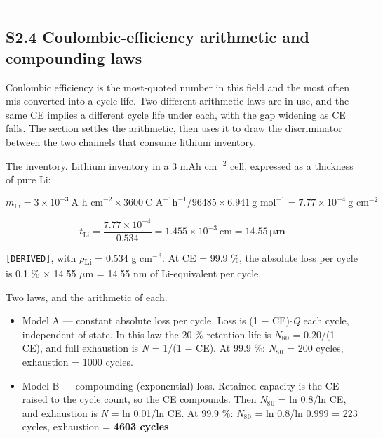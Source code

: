 \documentclass[11pt,a4paper]{article}
\begin{document}
\par\noindent\rule{\linewidth}{0.4pt}\par


\subsection*{S2.4 Coulombic-efficiency arithmetic and compounding laws}


Coulombic efficiency is the most-quoted number in this field and the most often mis-converted into a cycle life. Two different arithmetic laws are in use, and the same CE implies a different cycle life under each, with the gap widening as CE falls. The section settles the arithmetic, then uses it to draw the discriminator between the two channels that consume lithium inventory.


The inventory. Lithium inventory in a 3 mAh cm\ensuremath{^{-}}\ensuremath{^{2}} cell, expressed as a thickness of pure Li:


\begin{equation}m_{\text{Li}} = 3\times10^{-3}\ \text{A h cm}^{-2}\times3600\ \text{C A}^{-1}\text{h}^{-1} / 96485 \times 6.941\ \text{g mol}^{-1} = 7.77\times10^{-4}\ \text{g cm}^{-2} \nonumber\end{equation}


\begin{equation}t_{\text{Li}} = \frac{7.77\times10^{-4}}{0.534} = 1.455\times10^{-3}\ \text{cm} = \mathbf{14.55\ \mu m} \tag{S2.12}\end{equation}


\texttt{[DERIVED]}, with \ensuremath{\rho}\textsubscript{Li} = 0.534 g cm\ensuremath{^{-}}\ensuremath{^{3}}. At CE = 99.9 \%, the absolute loss per cycle is 0.1 \% \ensuremath{\times} 14.55 \ensuremath{\mu}m = 14.55 nm of Li-equivalent per cycle.


Two laws, and the arithmetic of each.


\begin{itemize}
  \item Model A --- constant absolute loss per cycle. Loss is (1 \ensuremath{-} CE)\ensuremath{\cdot}\emph{Q} each cycle, independent of state. In this law the 20 \%-retention life is \emph{N}\ensuremath{_{8}}\ensuremath{_{0}} = 0.20/(1 \ensuremath{-} CE), and full exhaustion is \emph{N} = 1/(1 \ensuremath{-} CE). At 99.9 \%: \emph{N}\ensuremath{_{8}}\ensuremath{_{0}} = 200 cycles, exhaustion = 1000 cycles.
  \item Model B --- compounding (exponential) loss. Retained capacity is the CE raised to the cycle count, so the CE compounds. Then \emph{N}\ensuremath{_{8}}\ensuremath{_{0}} = ln 0.8/ln CE, and exhaustion is \emph{N} = ln 0.01/ln CE. At 99.9 \%: \emph{N}\ensuremath{_{8}}\ensuremath{_{0}} = ln 0.8/ln 0.999 = 223 cycles, exhaustion = \textbf{4603 cycles}.
\end{itemize}
\end{document}
